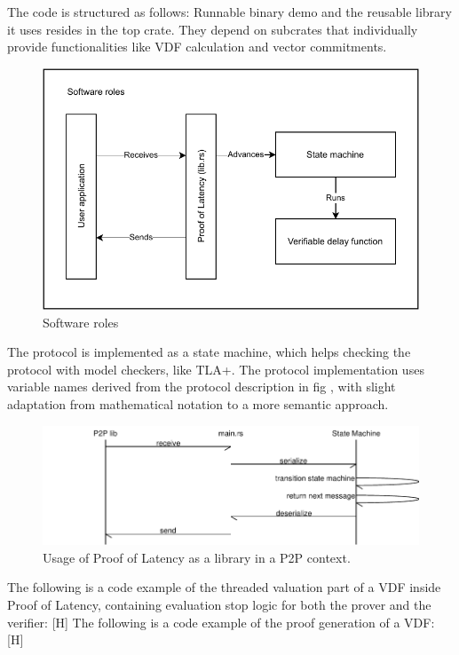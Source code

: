 The code is structured as follows: Runnable binary demo and the reusable library it uses resides in the top crate. They depend on subcrates that individually provide functionalities like VDF calculation and vector commitments.

\begin{figure}
	\includegraphics[width=\textwidth]{pictures/PoL_software_roles.pdf}
	\caption{Software roles}
	\label{software_roles}
\end{figure}

The protocol is implemented as a state machine, which helps checking the protocol with model checkers, like TLA+. %
 The protocol implementation uses variable names derived from the protocol description in fig %
 , with slight adaptation from mathematical notation to a more semantic approach.

\begin{figure}
	\includegraphics[width=\textwidth]{pictures/message_flow-eps-converted-to.pdf}
	\caption{Usage of Proof of Latency as a library in a P2P context.}
	\label{message_flow}
\end{figure}

The following is a code example of the threaded valuation part of a VDF inside Proof of Latency, containing evaluation stop logic for both the prover and the verifier:
[H]
The following is a code example of the proof generation of a VDF:
[H]

